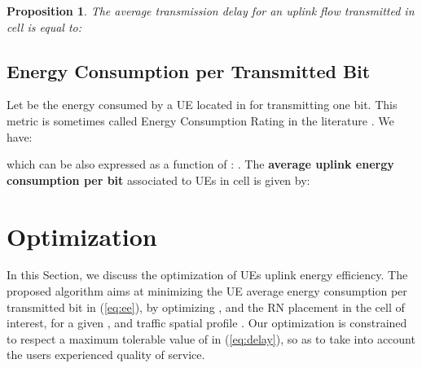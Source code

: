 \documentclass[draftcls,onecolumn]{IEEEtran}
\theoremstyle{plain}
\newtheorem{proposition}{Proposition}
\theoremstyle{definition}
\def\config{\mathbf{x}}
\def\objective{{\Pi}} \def\constraint{{\cal D}}
\def\constraintmax{D_{\mbox{{\tiny max}}}}
\def\multiplier{\mu}
\def\augmented{{\cal F}}
\def\feasable{\tilde{\Omega}}
\def\objective{{\Pi}} \def\constraint{D_c} \def\constraintmax{D_{\mbox{{\tiny max}}}}
\def\multiplier{\mu}
\def\augmented{{\cal F}}
\def\feasable{\tilde{\Omega}}
\def\slack{t}
\def\Real{\mathbb{R}}
\def\st{\mbox{ s.t. }} \def\ie{\mbox{\em i.e., }} \def\wrt{\mbox{\em wrt. }}
\def\Real{\mathbb{R}}
\def\st{\mbox{ s.t. }} \def\ie{\mbox{\em i.e., }}
\def\ul{\underline}
\def\ra{\rightarrow}
\newcommand{\bbbp}{{\rm I\!P}}
\def\bbbone{{\mathchoice {\rm 1\mskip-4mu l} {\rm 1\mskip-4mu l} {\rm
1\mskip-4.5mu l} {\rm 1\mskip-5mu l}}}
\def\charact{\bbbone}
\def\dsp{\displaystyle}
\def\cond{\ |\ }
\begin{document}
\begin{proposition}
The average transmission delay  for an uplink flow transmitted in cell  is equal to:

\end{proposition}

\subsection{Energy Consumption per Transmitted Bit}
Let  be the energy consumed by a UE located in  for transmitting one bit. This metric is sometimes called Energy Consumption Rating in the literature \cite{Suarez12, Han11}. We have:

which can be also expressed as a function of :
.
The {\bf average uplink energy consumption per bit}  associated to UEs in cell  is given by:




 
\section{Optimization} \label{optimization}



\def\config#1{\boldsymbol{#1}}
\def\objective{{\Pi}} \def\constraint{D_c} \def\constraintmax{D_{\mbox{{\tiny max}}}}
\def\prior{V}
\def\multiplier{\mu}
\def\augmented{{\cal F}}
\def\feasable{\tilde{\Omega}}

\def\slack{t}

\def\Real{\mathbb{R}}
\def\st{\mbox{ s.t. }} \def\ie{\mbox{\em i.e., }} \def\wrt{\mbox{\em wrt. }} 

\def\ul{\underline}
\def\ra{\rightarrow}


\def\charact{\bbbone}
\def\dsp{\displaystyle}
\def\cond{\ |\ }
\def\Ra{\Rightarrow}

\def\ra{\rightarrow}
\def\Ra{\Rightarrow}
\def\lra{\leftrightarrow}
\def\Lra{\Leftrightarrow}

\def\ie{\hspace*{-1mm}\mbox{, {\em i.e.,} }} 
\def\dsp{\displaystyle}

\def\Pr{\mbox{Pr}} \def\bbbp{\mathbb{P}}
\def\Pr{\bbbp}

\def\proposal{r} \def\acceptance{\Xi}

In this Section, we discuss the optimization of UEs uplink energy efficiency. 
The proposed algorithm aims at minimizing the UE average energy consumption per transmitted bit in (\ref{eq:ee}), by optimizing ,  and the RN placement in the cell of interest, for a given ,  and traffic spatial profile . Our optimization is constrained to respect a maximum tolerable value of  in (\ref{eq:delay}), so as to take into account the users experienced quality of service. 
\end{document}
